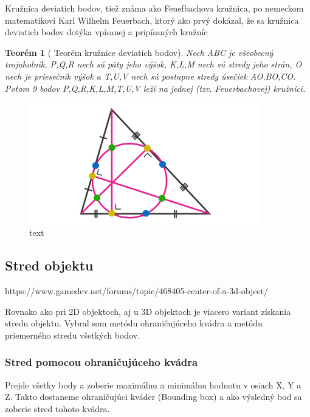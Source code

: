 Kružnica deviatich bodov, tiež známa ako Feuefbachova kružnica, po nemeckom matematikovi Karl Wilhelm Feuerbach, ktorý ako prvý dokázal, že sa kružnica deviatich bodov dotýka vpísanej a pripísaných kružníc \cite{NinePointTheorem} 


\newtheorem{theorem}{Teorém}
 
\begin{theorem}[{\cite{https://lms.umb.sk/mod/book/tool/print/index.php?id=76930&chapterid=1746} Teorém kružnice deviatich bodov}]
Nech ABC je všeobecný trojuholník, P,Q,R nech sú päty jeho výšok, K,L,M nech sú stredy jeho strán, O nech je priesečník výšok a T,U,V nech sú postupne stredy úsečiek AO,BO,CO. Potom 9 bodov P,Q,R,K,L,M,T,U,V leží na jednej (tzv. Feuerbachovej) kružnici. 

\end{theorem}


\begin{figure}[H]
	\centering
	\includegraphics[width=0.9\textwidth]{obrazky-figures/NinePointCircle.png}
	\caption{text}
	\label{fig:TriangleCenters}
\end{figure}



\subsection{Stred objektu}
https://www.gamedev.net/forums/topic/468405-center-of-a-3d-object/

Rovnako ako pri 2D objektoch, aj u 3D objektoch je viacero variant získania stredu objektu. Vybral som metódu ohraničujúceho kvádra a metódu priemerného stredu všetkých bodov.


\subsubsection{Stred pomocou ohraničujúceho kvádra}
Prejde všetky body a zoberie maximálnu a minimálnu hodnotu v osiach X, Y a Z. Takto dostaneme ohraničujúci kváder (Bounding box) a ako výsledný bod sa zoberie stred tohoto kvádra.

